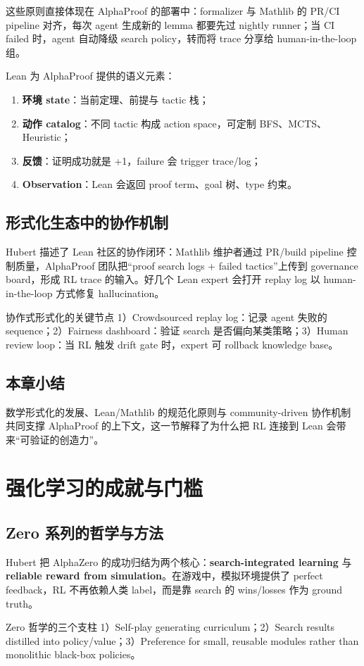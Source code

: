 \documentclass[a4paper]{article}
\begin{document}
这些原则直接体现在 AlphaProof 的部署中：formalizer 与 Mathlib 的 PR/CI pipeline 对齐，每次 agent 生成新的 lemma 都要先过 nightly runner；当 CI failed 时，agent 自动降级 search policy，转而将 trace 分享给 human-in-the-loop 组。

Lean 为 AlphaProof 提供的语义元素：
\begin{enumerate}
    \item \textbf{环境 state}：当前定理、前提与 tactic 栈；
    \item \textbf{动作 catalog}：不同 tactic 构成 action space，可定制 BFS、MCTS、Heuristic；
    \item \textbf{反馈}：证明成功就是 +1，failure 会 trigger trace/log；
    \item \textbf{Observation}：Lean 会返回 proof term、goal 树、type 约束。
\end{enumerate}

\subsection{形式化生态中的协作机制}
Hubert 描述了 Lean 社区的协作闭环：Mathlib 维护者通过 PR/build pipeline 控制质量，AlphaProof 团队把“proof search logs + failed tactics”上传到 governance board，形成 RL trace 的输入。好几个 Lean expert 会打开 replay log 以 human-in-the-loop 方式修复 hallucination。

\begin{knowledgebox}{协作式形式化的关键节点}
1）Crowdsourced replay log：记录 agent 失败的 sequence；2）Fairness dashboard：验证 search 是否偏向某类策略；3）Human review loop：当 RL 触发 drift gate 时，expert 可 rollback knowledge base。
\end{knowledgebox}

\subsection{本章小结}
数学形式化的发展、Lean/Mathlib 的规范化原则与 community-driven 协作机制共同支撑 AlphaProof 的上下文，这一节解释了为什么把 RL 连接到 Lean 会带来“可验证的创造力”。
\newpage

\section{强化学习的成就与门槛}

\subsection{Zero 系列的哲学与方法}
Hubert 把 AlphaZero 的成功归结为两个核心：\textbf{search-integrated learning} 与 \textbf{reliable reward from simulation}。在游戏中，模拟环境提供了 perfect feedback，RL 不再依赖人类 label，而是靠 search 的 wins/losses 作为 ground truth。
\begin{knowledgebox}{Zero 哲学的三个支柱}
1）Self-play generating curriculum；2）Search results distilled into policy/value；3）Preference for small, reusable modules rather than monolithic black-box policies。
\end{knowledgebox}
\end{document}
